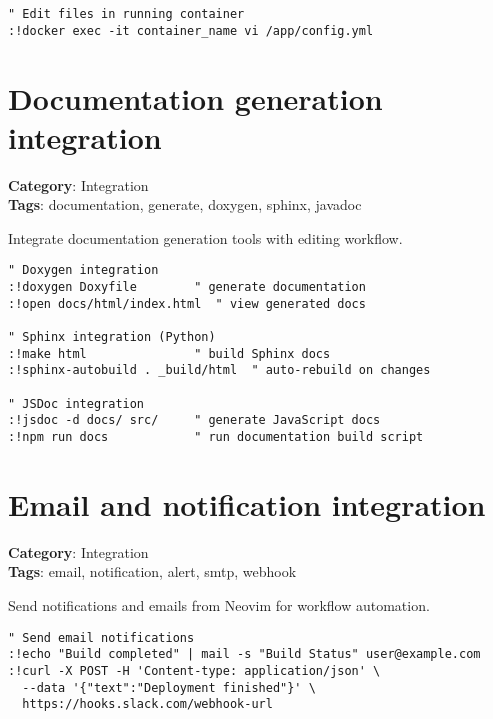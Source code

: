 {{{{{{\begin{Exa*}{}
\begin{Verbatim}[fontsize=\footnotesize, breaklines, breakanywhere]
" Edit files in running container
:!docker exec -it container_name vi /app/config.yml
\end{Verbatim}
\end{Exa*}

\section{Documentation generation integration}

\textbf{Category}: Integration\\ \textbf{Tags}: documentation, generate, doxygen, sphinx, javadoc
\vspace{0.5cm}

Integrate documentation generation tools with editing workflow.

\begin{Exa*}{}
\begin{Verbatim}[fontsize=\footnotesize, breaklines, breakanywhere]
" Doxygen integration
:!doxygen Doxyfile        " generate documentation
:!open docs/html/index.html  " view generated docs

" Sphinx integration (Python)
:!make html               " build Sphinx docs
:!sphinx-autobuild . _build/html  " auto-rebuild on changes

" JSDoc integration
:!jsdoc -d docs/ src/     " generate JavaScript docs
:!npm run docs            " run documentation build script
\end{Verbatim}
\end{Exa*}

\section{Email and notification integration}

\textbf{Category}: Integration\\ \textbf{Tags}: email, notification, alert, smtp, webhook
\vspace{0.5cm}

Send notifications and emails from Neovim for workflow automation.

\begin{Exa*}{}
\begin{Verbatim}[fontsize=\footnotesize, breaklines, breakanywhere]
" Send email notifications
:!echo "Build completed" | mail -s "Build Status" user@example.com
:!curl -X POST -H 'Content-type: application/json' \
  --data '{"text":"Deployment finished"}' \
  https://hooks.slack.com/webhook-url


\end{Verbatim}
\end{Exa*}}}}}}}
